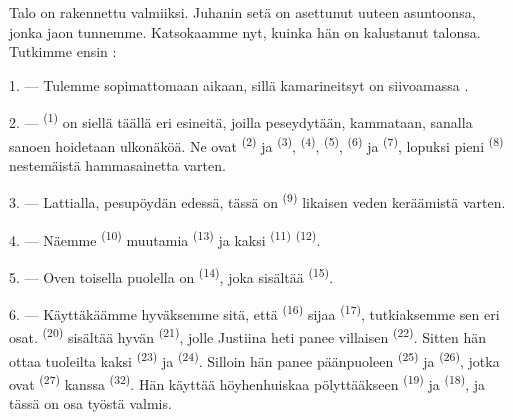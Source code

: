 %

\VUsaut{6.0mm}
\VUsaut{1.4mm}
\VUsaut{0.4mm}
\VUsaut{2.2mm}

Talo on rakennettu valmiiksi. Juhanin setä on asettunut uuteen asuntoonsa, jonka
jaon tunnemme. Katsokaamme nyt, kuinka hän on kalustanut talonsa. Tutkimme
ensin :

\VUsaut{3.0mm}

1. --- Tulemme sopimattomaan aikaan, sillä kamarineitsyt on siivoamassa
.

2. ---  \textsuperscript{(1)} on siellä täällä eri
esineitä, joilla peseydytään, kammataan, sanalla sanoen hoidetaan ulkonäköä. Ne
ovat  \textsuperscript{(2)} ja 
\textsuperscript{(3)},  \textsuperscript{(4)},
 \textsuperscript{(5)},  \textsuperscript{(6)} ja
 \textsuperscript{(7)}, lopuksi pieni 
\textsuperscript{(8)} nestemäistä hammasainetta varten.

3. --- Lattialla, pesupöydän edessä, tässä on 
\textsuperscript{(9)} likaisen veden keräämistä varten.

4. --- Näemme  \textsuperscript{(10)} muutamia
 \textsuperscript{(13)} ja kaksi 
\textsuperscript{(11)}  \textsuperscript{(12)}.

5. --- Oven toisella puolella on  \textsuperscript{(14)},
joka sisältää  \textsuperscript{(15)}.

6. --- Käyttäkäämme hyväksemme sitä, että 
\textsuperscript{(16)} sijaa  \textsuperscript{(17)},
tutkiaksemme sen eri osat.  \textsuperscript{(20)} sisältää
hyvän  \textsuperscript{(21)}, jolle Justiina heti panee
villaisen  \textsuperscript{(22)}. Sitten hän ottaa tuoleilta
kaksi  \textsuperscript{(23)} ja 
\textsuperscript{(24)}. Silloin hän panee päänpuoleen  \textsuperscript{(25)} ja  \textsuperscript{(26)},
jotka ovat  \textsuperscript{(27)} kanssa
 \textsuperscript{(32)}. Hän käyttää höyhenhuiskaa
pölyttääkseen  \textsuperscript{(19)} ja 
\textsuperscript{(18)}, ja tässä on osa työstä valmis.

